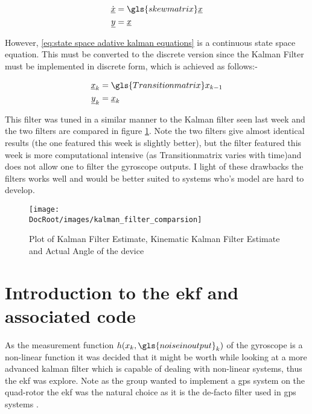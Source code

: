\begin{align}
\begin{split}
\dot{\underline{x}} &= \gls{skewmatrix}\underline{x}\\
\underline{y}              &= \underline{x}
\end{split}
\label{eq:state space adative kalman equations}
\end{align}

However, \eqref{eq:state space adative kalman equations} is a continuous state space equation. This must be converted to the discrete version since the Kalman Filter must be implemented in discrete form, which is achieved as follows:-
 
 \begin{align}
\begin{split}
 \underline{x}_k &= \gls{Transitionmatrix}x_{k-1}\\
 \underline{y}_k              &= \underline{x}_k
\end{split}
 \end{align}

This filter was tuned in a similar manner to the Kalman filter seen last week and the two filters are compared in figure \ref{Fig: Kalman Filter Estimate and Kinematic Kalman Filter Estimate}. Note the two filters give almost identical results (the one featured this week is slightly better), but the filter featured this week is more computational intensive (as \gls{Transitionmatrix} varies with time)and does not allow one to filter the gyroscope outputs. I light of these drawbacks the filters works well and would be better suited to systems who's model are hard to develop.
						\begin{figure}[h]
							\centering
							\texttt{[image: \\DocRoot/images/kalman\_filter\_comparsion]}
							\caption{Plot of Kalman Filter Estimate, Kinematic Kalman Filter Estimate and Actual Angle of the device}
							\label{Fig: Kalman Filter Estimate and Kinematic Kalman Filter Estimate}
						\end{figure}




 \tocless\section{Introduction to the \gls{ekf} and associated code}
As the measurement function $h(x_k,\gls{noiseinoutput}_k)$ of the gyroscope is a non-linear function it was decided that it might be worth while looking at a more advanced kalman filter which is capable of dealing with non-linear systems, thus the \gls{ekf} was explore. Note as the group wanted to implement a \gls{gps} system on the quad-rotor the \gls{ekf} was the natural choice as it is the de-facto filter used in \gls{gps} systems \cite{An_Introduction_to_the_Kalman_Filter}. 


